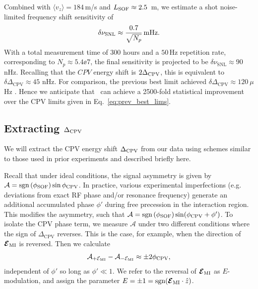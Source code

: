 Combined with $\langle v_z \rangle = 184\,$m/s and $L_{\rm SOF} \approx 2.5\,$ m, we estimate a shot noise-limited frequency shift sensitivity of 
\begin{equation}
    \label{eq:shot_noise}
	\delta \nu_\mathrm{SNL} \approx \frac{0.7}{\sqrt{N_p}}\,\mathrm{mHz}.
\end{equation}
With a total measurement time of 300 hours and a $50\,$Hz repetition rate, corresponding to $N_p \approx 5.4\ee{7}$, the final sensitivity is projected to be $\delta \nu_\mathrm{SNL} \approx 90\,$nHz. Recalling that the $CPV$ energy shift is $2\Delta_{\rm CPV}$, this is equivalent to $\delta \Delta_\mathrm{CPV} \approx 45$ nHz.
For comparison, the previous best limit achieved $\delta\Delta_\mathrm{CPV} \approx 120~\mu$Hz \cite{cho1991search}. Hence we anticipate that \CENTREX\ can achieve a 2500-fold statistical improvement over the CPV limits given in Eq.~\ref{eq:prev_best_lims}.

\subsection{Extracting \texorpdfstring{$\Delta_{\rm CPV}$}{dCVP}}

We will extract the CPV energy shift $\Delta_{\rm CPV}$ from our data using schemes similar to those used in prior experiments \cite{wilkening1984search,cho1991tight,regan2002new,andreev_improved_2018} and described briefly here.

Recall that under ideal conditions, the signal asymmetry is given by 
$\mathcal{A}= \operatorname{sgn}\left(\phi_\mathrm{SOF}\right) \sin \phi_{\rm CPV}$.
In practice, various experimental imperfections (e.g. deviations from exact RF phase and/or resonance frequency) generate an additional accumulated phase $\phi'$ during free precession in the interaction region. 
This modifies the asymmetry, such that $\mathcal{A}= \operatorname{sgn}\left(\phi_\mathrm{SOF}\right) \sin (\phi_{\rm CPV} + \phi')$.
To isolate the CPV phase term, we measure $\mathcal{A}$ under two different conditions where the sign of $\Delta_\mathrm{CPV}$ reverses. This is the case, for example, when the direction of $\bm{\mathcal{E}}_\mathrm{MI}$
is reversed.
Then we calculate
\begin{equation}
    \mathcal{A}_{+\mathcal{E}_\mathrm{MI}} - \mathcal{A}_{-\mathcal{E}_\mathrm{MI}} \approx \pm 2\phi_{\rm CPV},
\end{equation}   
independent of $\phi'$ so long as $\phi' \ll 1$.  We refer to the reversal of $\bm{\mathcal{E}}_\mathrm{MI}$ as $E$-modulation, and assign the parameter $E = \pm 1 = \mathrm{sgn}(\bm{\mathcal{E}}_\mathrm{MI} \cdot \hat{z})$.

